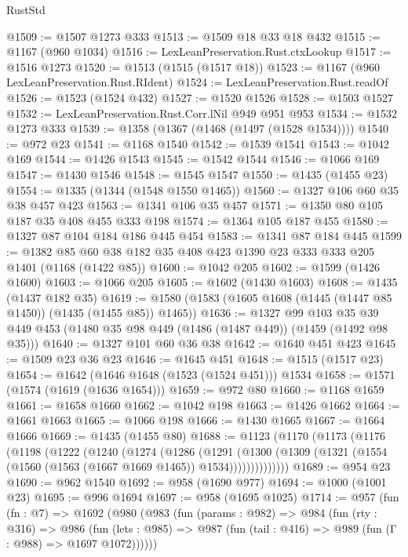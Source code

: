 \begin{lexlean}{RustStd}
\begin{coremodule}
@1509 := @1507 @1273 @333
@1513 := @1509 @18 @33 @18 @432
@1515 := @1167 (@960 @1034)
@1516 := LexLeanPreservation.Rust.ctxLookup
@1517 := @1516 @1273
@1520 := @1513 (@1515 (@1517 @18))
@1523 := @1167 (@960 LexLeanPreservation.Rust.RIdent)
@1524 := LexLeanPreservation.Rust.readOf
@1526 := @1523 (@1524 @432)
@1527 := @1520 @1526
@1528 := @1503 @1527
@1532 := LexLeanPreservation.Rust.Corr.lNil @949 @951 @953
@1534 := @1532 @1273 @333
@1539 := @1358 (@1367 (@1468 (@1497 (@1528 @1534))))
@1540 := @972 @23
@1541 := @1168 @1540
@1542 := @1539 @1541
@1543 := @1042 @169
@1544 := @1426 @1543
@1545 := @1542 @1544
@1546 := @1066 @169
@1547 := @1430 @1546
@1548 := @1545 @1547
@1550 := @1435 (@1455 @23)
@1554 := @1335 (@1344 (@1548 @1550 @1465))
@1560 := @1327 @106 @60 @35 @38 @457 @423
@1563 := @1341 @106 @35 @457
@1571 := @1350 @80 @105 @187 @35 @408 @455 @333 @198
@1574 := @1364 @105 @187 @455
@1580 := @1327 @87 @104 @184 @186 @445 @454
@1583 := @1341 @87 @184 @445
@1599 := @1382 @85 @60 @38 @182 @35 @408 @423 @1390 @23 @333 @333 @205 @1401 (@1168 (@1422 @85))
@1600 := @1042 @205
@1602 := @1599 (@1426 @1600)
@1603 := @1066 @205
@1605 := @1602 (@1430 @1603)
@1608 := @1435 (@1437 @182 @35)
@1619 := @1580 (@1583 (@1605 @1608 (@1445 (@1447 @85 @1450)) (@1435 (@1455 @85)) @1465))
@1636 := @1327
    @99
    @103
    @35
    @39
    @449
    @453
    (@1480 @35 @98 @449 (@1486 (@1487 @449)) (@1459 (@1492 @98 @35)))
@1640 := @1327 @101 @60 @36 @38
@1642 := @1640 @451 @423
@1645 := @1509 @23 @36 @23
@1646 := @1645 @451
@1648 := @1515 (@1517 @23)
@1654 := @1642 (@1646 @1648 (@1523 (@1524 @451))) @1534
@1658 := @1571 (@1574 (@1619 (@1636 @1654)))
@1659 := @972 @80
@1660 := @1168 @1659
@1661 := @1658 @1660
@1662 := @1042 @198
@1663 := @1426 @1662
@1664 := @1661 @1663
@1665 := @1066 @198
@1666 := @1430 @1665
@1667 := @1664 @1666
@1669 := @1435 (@1455 @80)
@1688 := @1123
    (@1170
      (@1173
        (@1176
          (@1198
            (@1222
              (@1240
                (@1274
                  (@1286
                    (@1291
                      (@1300
                        (@1309 (@1321 (@1554 (@1560 (@1563 (@1667 @1669 @1465)) @1534))))))))))))))
@1689 := @954 @23
@1690 := @962 @1540
@1692 := @958 (@1690 @977)
@1694 := @1000 (@1001 @23)
@1695 := @996 @1694
@1697 := @958 (@1695 @1025)
@1714 := @957
    (fun (fn : @7) =>
    @1692
      (@980
        (@983
          (fun (params : @982) =>
          @984
            (fun (rty : @316) =>
            @986
              (fun (lets : @985) =>
              @987 (fun (tail : @416) => @989 (fun (Γ : @988) => @1697 @1072))))))

\end{coremodule}
\end{lexlean}
